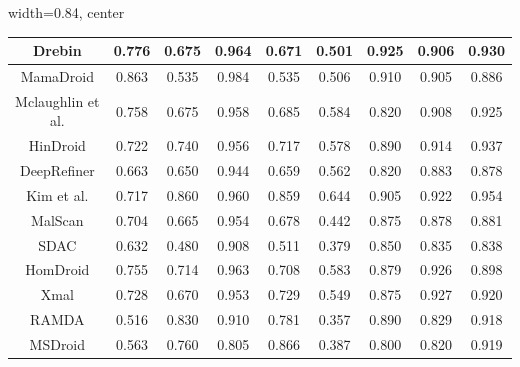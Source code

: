 \begin{table}[t]
\begin{adjustbox}{width=0.84\linewidth, center}
\begin{tabular}{@{}c|cccc|cccc@{}}
     Drebin          & \multicolumn{1}{c|}{0.776} & \multicolumn{1}{c|}{0.675} & \multicolumn{1}{c|}{0.964} & 0.671 & \multicolumn{1}{c|}{0.501} & \multicolumn{1}{c|}{0.925} & \multicolumn{1}{c|}{0.906} & 0.930 \\ \midrule
     MamaDroid       & \multicolumn{1}{c|}{0.863} & \multicolumn{1}{c|}{0.535} & \multicolumn{1}{c|}{0.984} & 0.535 & \multicolumn{1}{c|}{0.506} & \multicolumn{1}{c|}{0.910} & \multicolumn{1}{c|}{0.905} & 0.886 \\ \midrule
     Mclaughlin et al.& \multicolumn{1}{c|}{0.758} & \multicolumn{1}{c|}{0.675} & \multicolumn{1}{c|}{0.958} & 0.685 & \multicolumn{1}{c|}{0.584} & \multicolumn{1}{c|}{0.820} & \multicolumn{1}{c|}{0.908} & 0.925 \\ \midrule
     HinDroid        & \multicolumn{1}{c|}{0.722} & \multicolumn{1}{c|}{0.740} & \multicolumn{1}{c|}{0.956} & 0.717 & \multicolumn{1}{c|}{0.578} & \multicolumn{1}{c|}{0.890} & \multicolumn{1}{c|}{0.914} & 0.937 \\ \midrule
     DeepRefiner     & \multicolumn{1}{c|}{0.663} & \multicolumn{1}{c|}{0.650} & \multicolumn{1}{c|}{0.944} & 0.659 & \multicolumn{1}{c|}{0.562} & \multicolumn{1}{c|}{0.820} & \multicolumn{1}{c|}{0.883} & 0.878 \\ \midrule
     Kim et al.      & \multicolumn{1}{c|}{0.717} & \multicolumn{1}{c|}{0.860} & \multicolumn{1}{c|}{0.960} & 0.859 & \multicolumn{1}{c|}{0.644} & \multicolumn{1}{c|}{0.905} & \multicolumn{1}{c|}{0.922} & 0.954 \\ \midrule
     MalScan         & \multicolumn{1}{c|}{0.704} & \multicolumn{1}{c|}{0.665} & \multicolumn{1}{c|}{0.954} & 0.678 & \multicolumn{1}{c|}{0.442} & \multicolumn{1}{c|}{0.875} & \multicolumn{1}{c|}{0.878} & 0.881 \\ \midrule
     SDAC            & \multicolumn{1}{c|}{0.632} & \multicolumn{1}{c|}{0.480} & \multicolumn{1}{c|}{0.908} & 0.511 & \multicolumn{1}{c|}{0.379} & \multicolumn{1}{c|}{0.850} & \multicolumn{1}{c|}{0.835} & 0.838 \\ \midrule
     HomDroid        & \multicolumn{1}{c|}{0.755} & \multicolumn{1}{c|}{0.714} & \multicolumn{1}{c|}{0.963} & 0.708 & \multicolumn{1}{c|}{0.583} & \multicolumn{1}{c|}{0.879} & \multicolumn{1}{c|}{0.926} & 0.898 \\ \midrule
     Xmal            & \multicolumn{1}{c|}{0.728} & \multicolumn{1}{c|}{0.670} & \multicolumn{1}{c|}{0.953} & 0.729 & \multicolumn{1}{c|}{0.549} & \multicolumn{1}{c|}{0.875} & \multicolumn{1}{c|}{0.927} & 0.920 \\ \midrule
     RAMDA           & \multicolumn{1}{c|}{0.516} & \multicolumn{1}{c|}{0.830} & \multicolumn{1}{c|}{0.910} & 0.781 & \multicolumn{1}{c|}{0.357} & \multicolumn{1}{c|}{0.890} & \multicolumn{1}{c|}{0.829} & 0.918 \\ \midrule
     MSDroid         & \multicolumn{1}{c|}{0.563} & \multicolumn{1}{c|}{0.760} & \multicolumn{1}{c|}{0.805} & 0.866 & \multicolumn{1}{c|}{0.387} & \multicolumn{1}{c|}{0.800} & \multicolumn{1}{c|}{0.820} & 0.919 \\


\end{tabular}
\end{adjustbox}
\end{table}
